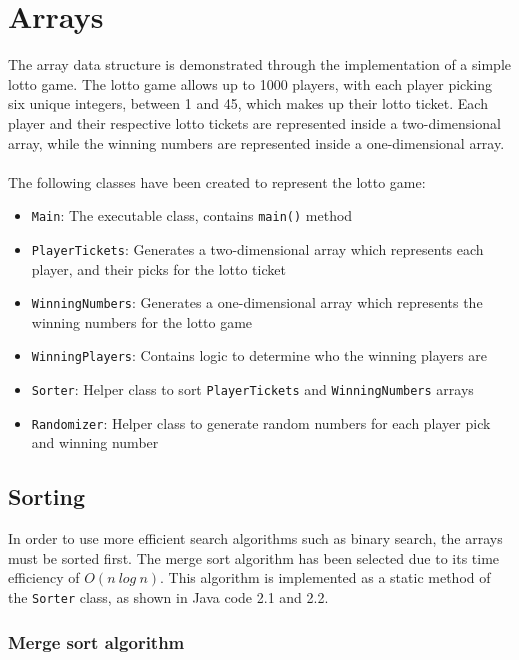 \newpage
\section{Arrays}

The array data structure is demonstrated through the implementation of a simple lotto game. The lotto game allows up to 1000 players, with each player picking six unique integers, between 1 and 45, which makes up their lotto ticket. Each player and their respective lotto tickets are represented inside a two-dimensional array, while the winning numbers are represented inside a one-dimensional array.
\\
\\
The following classes have been created to represent the lotto game:

\begin{itemize}
\item \texttt{Main}: The executable class, contains \texttt{main()} method
\item \texttt{PlayerTickets}: Generates a two-dimensional array which represents each player, and their picks for the lotto ticket
\item \texttt{WinningNumbers}: Generates a one-dimensional array which represents the winning numbers for the lotto game
\item \texttt{WinningPlayers}: Contains logic to determine who the winning players are
\item \texttt{Sorter}: Helper class to sort \texttt{PlayerTickets} and \texttt{WinningNumbers} arrays
\item \texttt{Randomizer}: Helper class to generate random numbers for each player pick and winning number
\end{itemize}

\subsection{Sorting}

In order to use more efficient search algorithms such as binary search, the arrays must be sorted first. The merge sort algorithm has been selected due to its time efficiency of $O(n \ log \ n)$. This algorithm is implemented as a static method of the \texttt{Sorter} class, as shown in Java code 2.1 and 2.2.

\subsubsection{Merge sort algorithm}

